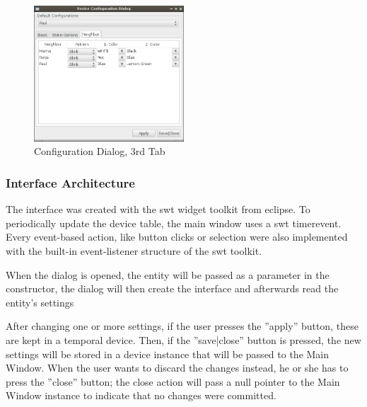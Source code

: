 \begin{figure}[h!]
 \centering
 \includegraphics[width= 0.5\textwidth, clip=true  ,keepaspectratio=true]{./pic/java-server-config03.png}
 \caption{Configuration Dialog, 3rd Tab}
 \label{fig:java-server-config03}
\end{figure}

\subsubsection{Interface Architecture}
The interface was created with the swt widget toolkit from eclipse. %
To periodically update the device table, the main window uses a swt timerevent. Every event-based action, like button clicks or selection were also implemented with the built-in event-listener structure of the swt toolkit. %

When the dialog is opened, the entity will be passed as a parameter in the constructor, the dialog will then create the interface and afterwards read the entity's settings %

After changing one or more settings, if the user presses the ''apply'' button, these are kept in a temporal device. Then, if the ''save|close'' button is pressed, the new settings will be stored in a device instance that will be passed to the Main Window. When the user wants to discard the changes instead, he or she has to press the ''close'' button; the close action will pass a null pointer to the Main Window instance to indicate that no changes were committed. 


